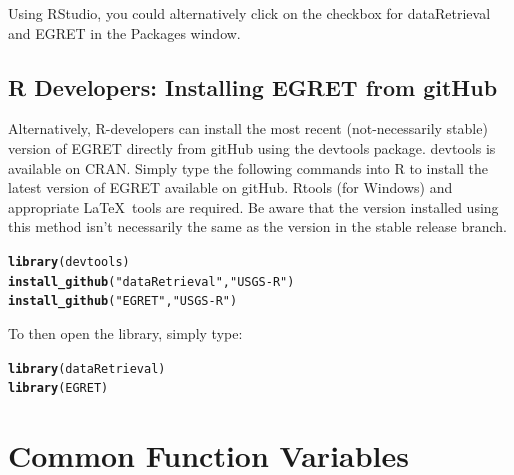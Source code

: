 \documentclass[a4paper,11pt]{article}\usepackage{graphicx, color}
\makeatletter
\newcommand{\hlfunctioncall}[1]{\textcolor[rgb]{0.501960784313725,0,0.329411764705882}{\textbf{#1}}}%
\newcommand{\hlstring}[1]{\textcolor[rgb]{0.6,0.6,1}{#1}}%
\newenvironment{kframe}{%
 \def\at@end@of@kframe{}%
 \ifinner\ifhmode%
  \def\at@end@of@kframe{\end{minipage}}%
  \begin{minipage}{\columnwidth}%
 \fi\fi%
 \def\FrameCommand##1{\hskip\@totalleftmargin \hskip-\fboxsep
 \colorbox{shadecolor}{##1}\hskip-\fboxsep
     \hskip-\linewidth \hskip-\@totalleftmargin \hskip\columnwidth}%
 \MakeFramed {\advance\hsize-\width
   \@totalleftmargin\z@ \linewidth\hsize
   \@setminipage}}%
 {\par\unskip\endMakeFramed%
 \at@end@of@kframe}
\newenvironment{knitrout}{}{} %
\makeatother
\begin{document}
Using RStudio, you could alternatively click on the checkbox for dataRetrieval and EGRET in the Packages window.

\subsection{R Developers: Installing EGRET from gitHub}
Alternatively, R-developers can install the most recent (not-necessarily stable) version of EGRET directly from gitHub using the devtools package.  devtools is available on CRAN.  Simply type the following commands into R to install the latest version of EGRET available on gitHub.  Rtools (for Windows) and appropriate \LaTeX\ tools are required. Be aware that the version installed using this method isn't necessarily the same as the version in the stable release branch.  


\begin{knitrout}
\color{fgcolor}\begin{kframe}
\begin{alltt}
\hlfunctioncall{library}(devtools)
\hlfunctioncall{install_github}(\hlstring{"dataRetrieval"}, \hlstring{"USGS-R"})
\hlfunctioncall{install_github}(\hlstring{"EGRET"}, \hlstring{"USGS-R"})
\end{alltt}
\end{kframe}
\end{knitrout}

To then open the library, simply type:

\begin{knitrout}
\color{fgcolor}\begin{kframe}
\begin{alltt}
\hlfunctioncall{library}(dataRetrieval)
\hlfunctioncall{library}(EGRET)
\end{alltt}
\end{kframe}
\end{knitrout}


\newpage
\FloatBarrier

\newpage
\FloatBarrier
\section{Common Function Variables}
\label{sec:appendixPlot}
\end{document}
